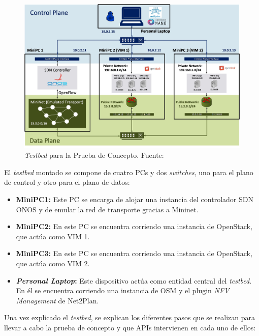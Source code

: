 \begin{figure}[!ht]
	\centering
	\includegraphics[width=0.9\linewidth]{imagenes/PoC_testbed}
	\caption{\textit{Testbed} para la Prueba de Concepto. Fuente:\cite{demoecocbib}}
	\label{fig:poctestbed}
\end{figure}

El \textit{testbed} montado se compone de cuatro \acp{PC} y dos \textit{switches}, uno para el plano de control y otro para el plano de datos:

\begin{itemize}
	\item \textbf{Mini\ac{PC}1:} Este \ac{PC} se encarga de alojar una instancia del controlador \ac{SDN} \ac{ONOS} y de emular la red de transporte gracias a Mininet.
	
	\item \textbf{Mini\ac{PC}2:} En este \ac{PC} se encuentra corriendo una instancia de OpenStack, que actúa como \ac{VIM} 1.
	
	\item \textbf{Mini\ac{PC}3:} En este \ac{PC} se encuentra corriendo una instancia de OpenStack, que actúa como \ac{VIM} 2.
	
	\item \textbf{\textit{Personal Laptop}:} Este dispositivo actúa como entidad central del \textit{testbed}. En él se encuentra corriendo una instancia de \ac{OSM} y el plugin \textit{NFV Management} de Net2Plan.
\end{itemize}


Una vez explicado el \textit{testbed}, se explican los diferentes pasos que se realizan para llevar a cabo la prueba de concepto y que \acp{API} intervienen en cada uno de ellos:

